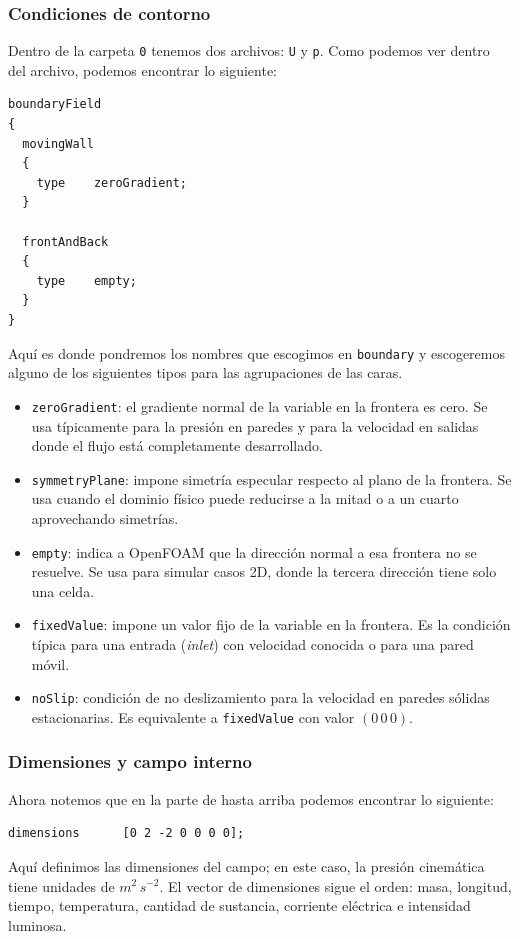 \subsubsection*{Condiciones de contorno}

Dentro de la carpeta \texttt{0} tenemos dos archivos: \texttt{U} y \texttt{p}. Como podemos ver dentro del archivo, podemos encontrar lo siguiente:
\begin{verbatim}
boundaryField
{
  movingWall
  {
    type    zeroGradient;
  }

  frontAndBack
  {
    type    empty;
  }
}
\end{verbatim}
Aquí es donde pondremos los nombres que escogimos en \texttt{boundary} y escogeremos alguno de los siguientes tipos para las agrupaciones de las caras.
\begin{itemize}
  \item \texttt{zeroGradient}: el gradiente normal de la variable en la frontera es cero. Se usa típicamente para la presión en paredes y para la velocidad en salidas donde el flujo está completamente desarrollado.
  \item \texttt{symmetryPlane}: impone simetría especular respecto al plano de la frontera. Se usa cuando el dominio físico puede reducirse a la mitad o a un cuarto aprovechando simetrías.
  \item \texttt{empty}: indica a OpenFOAM que la dirección normal a esa frontera no se resuelve. Se usa para simular casos 2D, donde la tercera dirección tiene solo una celda.
  \item \texttt{fixedValue}: impone un valor fijo de la variable en la frontera. Es la condición típica para una entrada (\textit{inlet}) con velocidad conocida o para una pared móvil.
  \item \texttt{noSlip}: condición de no deslizamiento para la velocidad en paredes sólidas estacionarias. Es equivalente a \texttt{fixedValue} con valor $(0\,0\,0)$.
\end{itemize}

\subsubsection*{Dimensiones y campo interno}

Ahora notemos que en la parte de hasta arriba podemos encontrar lo siguiente:
\begin{verbatim}
dimensions      [0 2 -2 0 0 0 0];
\end{verbatim}
Aquí definimos las dimensiones del campo; en este caso, la presión cinemática tiene unidades de $m^{2}\,s^{-2}$. El vector de dimensiones sigue el orden: masa, longitud, tiempo, temperatura, cantidad de sustancia, corriente eléctrica e intensidad luminosa.

